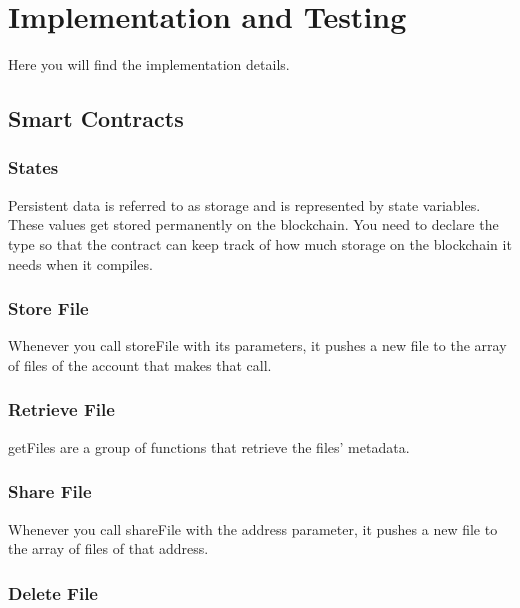 \section{Implementation and Testing}

Here you will find the implementation details.

\subsection{Smart Contracts}

\subsubsection{States}

Persistent data is referred to as storage and is represented by state variables. These values get stored permanently on the blockchain. You need to declare the type so that the contract can keep track of how much storage on the blockchain it needs when it compiles.



\subsubsection{Store File}

Whenever you call storeFile with its parameters, it pushes a new file to the array of files of the account that makes that call.


\subsubsection{Retrieve File}

getFiles are a group of functions that retrieve the files' metadata.


\subsubsection{Share File}

Whenever you call shareFile with the address parameter, it pushes a new file to the array of files of that address.


\subsubsection{Delete File}

